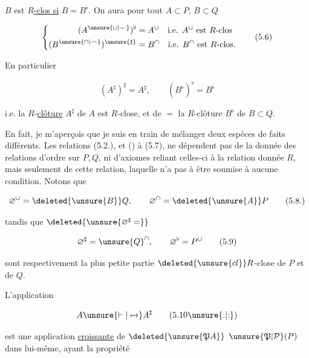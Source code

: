 
$B$ est \uline{$R$-clos si} $B=B^\flat$. On aura pour tout  $A\subset P$, $B\subset Q$

\[
\left\{\begin{aligned}
 (A^{\unsure{\cup|\smile}})^\flat&=A^\cup\quad\text{i.e. }A^\cup\text{ est }R\text{-clos}\\
 (B^{\unsure{\cap|\frown}})^{\unsure{\sharp}}&=B^\cap\quad\text{i.e. }B^\cap\text{ est }R\text{-clos.}
\end{aligned}\right.
\tag*{(5.6)}
\]

En particulier

\[
 (A^\sharp)^\sharp=A^\sharp,\qquad (B^\flat)^\flat=B^\flat
\tag*{(5.7.)}
\]

i.e. la $R$-\uline{clôture} $A^\sharp$ de $A$  est $R$-close, et de $=$ la $R$-clôture $B^\flat$ de $B\subset Q$.

En fait, je m'aperçois que je suis en train de mélanger deux espèces de faits différents.  Les relations (5.2.), et () à (5.7), ne dépendent pas de la donnée des relations d'ordre sur $P,Q$, ni d'axiomes reliant celles-ci à la relation donnée $R$, mais seulement de cette relation, laquelle n'a pas à être soumise à aucune condition. Notons que

\[
 \varnothing^\cup=\deleted{\unsure{B}}Q,\qquad \varnothing^\cap=\deleted{\unsure{A}}P
 \tag*{(5.8.)}
\]

tandis que $\deleted{\unsure{\varnothing^\sharp=}}$

\[
 \varnothing^\sharp=\unsure{Q}^\cap,\qquad \varnothing^\flat=P^\cup
 \tag*{(5.9)}
\]

sont respectivement la plus petite partie $\deleted{\unsure{cl}}R$-close de $P$ et de $Q$.

L'application

\[
 A\unsure{\vdash|\mapsto} A^\sharp
 \tag*{(5.10\unsure{.|:})}
\]

est une application \uline{croissante}  de $\deleted{\unsure{\mathfrak P A}}$  $\unsure{\mathfrak P|\mathcal P}(P)$ dans lui-même, ayant  la propriété

\deleted{\[
 \unsure{(A\subset B)^\sharp=A}
\]}
